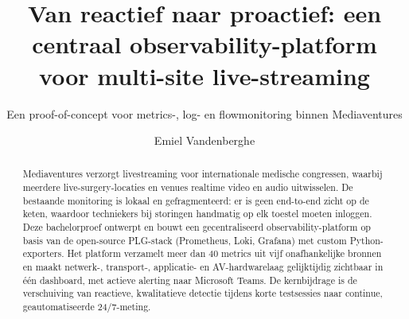 \documentclass[a0,portrait]{hogent-poster}
\title{Van reactief naar proactief: een centraal observability-platform voor multi-site live-streaming}
\subtitle{Een proof-of-concept voor metrics-, log- en flowmonitoring binnen Mediaventures}
\author{Emiel Vandenberghe}
\begin{document}
\maketitle

\begin{abstract}
Mediaventures verzorgt livestreaming voor internationale medische congressen, waarbij meerdere live-surgery-locaties en venues realtime video en audio uitwisselen. De bestaande monitoring is lokaal en gefragmenteerd: er is geen end-to-end zicht op de keten, waardoor techniekers bij storingen handmatig op elk toestel moeten inloggen. Deze bachelorproef ontwerpt en bouwt een gecentraliseerd observability-platform op basis van de open-source PLG-stack (Prometheus, Loki, Grafana) met custom Python-exporters. Het platform verzamelt meer dan 40 metrics uit vijf onafhankelijke bronnen en maakt netwerk-, transport-, applicatie- en AV-hardwarelaag gelijktijdig zichtbaar in \'e\'en dashboard, met actieve alerting naar Microsoft Teams. De kernbijdrage is de verschuiving van reactieve, kwalitatieve detectie tijdens korte testsessies naar continue, geautomatiseerde 24/7-meting.
\end{abstract}
\end{document}
